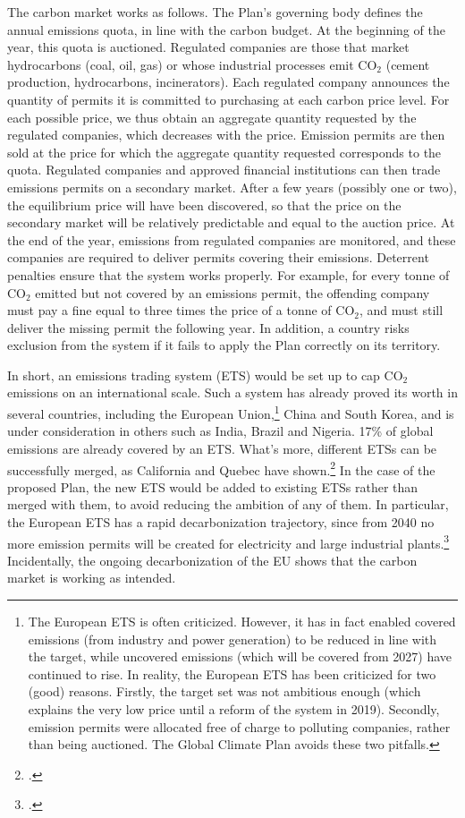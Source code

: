 \documentclass[a5paper,english,openany]{memoir}
\begin{document}
The carbon market works as follows. 
The Plan's governing body defines the annual emissions quota, in line with the carbon budget. At the beginning of the year, this quota is auctioned. %
Regulated companies are those that market hydrocarbons (coal, oil, gas) or whose industrial processes emit CO$_\text{2}$ (cement production, hydrocarbons, incinerators). 
Each regulated company announces the quantity of permits it is committed to purchasing at each carbon price level. For each possible price, we thus obtain an aggregate quantity requested by the regulated companies, which decreases with the price. Emission permits are then sold at the price for which the aggregate quantity requested corresponds to the quota. Regulated companies and approved financial institutions can then trade emissions permits on a secondary market. After a few years (possibly one or two), 
the equilibrium price will have been discovered, so that the price on the secondary market will be relatively predictable and equal to the auction price. At the end of the year, emissions from regulated companies are monitored, and these companies are required to deliver permits covering their emissions. %
Deterrent penalties ensure that the system works properly. For example, for every tonne of CO$_\text{2}$ emitted but not covered by an emissions permit, the offending company must pay a fine equal to three times the price of a tonne of CO$_\text{2}$, and must still deliver the missing permit the following year. In addition, a country risks exclusion from the system if it fails to apply the Plan correctly on its territory. %

In short, an emissions trading system (ETS) would be set up to cap CO$_\text{2}$ emissions on an international scale. 
Such a system has already proved its worth in several countries, including the European Union,\footnote{The European ETS is often criticized. However, it has in fact enabled covered emissions (from industry and power generation) to be reduced in line with the target, while uncovered emissions (which will be covered from 2027) have continued to rise. In reality, the European ETS has been criticized for two (good) reasons. Firstly, the target set was not ambitious enough (which explains the very low price until a reform of the system in 2019). Secondly, emission permits were allocated free of charge to polluting companies, rather than being auctioned. The Global Climate Plan avoids these two pitfalls.} China and South Korea, and is under consideration in others such as India, Brazil and Nigeria. 17\% of global emissions are already covered by an ETS. What's more, different ETSs can be successfully merged, as California and Quebec have shown.\footnote{\citet{icap_emissions_2023}.} In the case of the proposed Plan, the new ETS would be added to existing ETSs rather than merged with them, to avoid reducing the ambition of any of them. In particular, the European ETS has a rapid decarbonization trajectory, since from 2040 no more emission permits will be created for electricity and large industrial plants.\footnote{\citet{pahle_emerging_2023}.} Incidentally, the ongoing decarbonization of the EU shows that the carbon market is working as intended.
\end{document}

